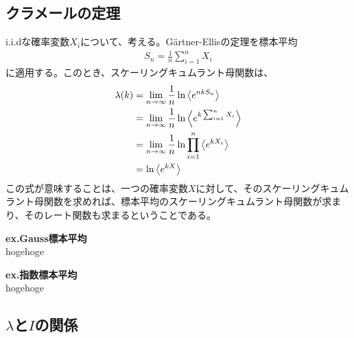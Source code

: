 \documentclass[a4paper,11pt]{jsarticle}
\numberwithin{equation}{section}
\begin{document}
\subsection{クラメールの定理}
i.i.dな確率変数$X_i$について、考える。G\"{a}rtner-Ellisの定理を標本平均
\begin{align}
    S_n = \frac{1}{n} \sum_{i=1}^{n} X_i
\end{align}
に適用する。このとき、スケーリングキュムラント母関数は、
\begin{align}
    \lambda(k) &= \lim_{n \to \infty} \frac{1}{n} \ln \expval{e^{nkS_n}}\\
    &= \lim_{n \to \infty} \frac{1}{n} \ln \expval{e^{k\sum_{i=1}^{n} X_i}}\\
    &= \lim_{n \to \infty} \frac{1}{n} \ln \prod_{i=1}^{n} \expval{e^{kX_i}}\\
    &= \ln \expval{e^{kX}}
\end{align}
この式が意味することは、一つの確率変数$X$に対して、そのスケーリングキュムラント母関数を求めれば、標本平均のスケーリングキュムラント母関数が求まり、そのレート関数も求まるということである。

\textbf{ex.Gauss標本平均} \\
hogehoge

\textbf{ex.指数標本平均} \\
hogehoge

\subsection{$\lambda$と$I$の関係}
\end{document}
